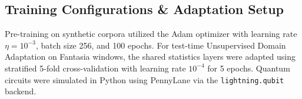 \subsection{Training Configurations \& Adaptation Setup}
Pre-training on synthetic corpora utilized the Adam optimizer with learning rate $\eta = 10^{-3}$, batch size 256, and 100 epochs. For test-time Unsupervised Domain Adaptation on Fantasia windows, the shared statistics layers were adapted using stratified 5-fold cross-validation with learning rate $10^{-4}$ for 5 epochs. Quantum circuits were simulated in Python using PennyLane \cite{bergholm2018pennylane} via the \texttt{lightning.qubit} backend.
